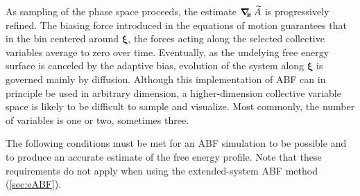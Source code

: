 As sampling of the phase space proceeds, the estimate
$\mbox{\boldmath$\nabla_{\!\!x}\,$} \widetilde A$ is progressively refined. The biasing
force introduced in the equations of motion guarantees that in
the bin centered around $\bm{\xi}$,
the forces acting along the selected collective variables average
to zero over time. Eventually, as the undelying free energy surface is canceled
by the adaptive bias, evolution of the system along $\bm{\xi}$
is governed mainly by diffusion.
Although this implementation of ABF can in principle be used in
arbitrary dimension, a higher-dimension collective variable space is likely
to be difficult to sample and visualize.
Most commonly, the number of variables is one or two, sometimes three.



The following conditions must be met for an ABF simulation to be possible and
to produce an accurate estimate of the free energy profile.
Note that these requirements do not apply when using the extended-system
ABF method (\ref{sec:eABF}).

